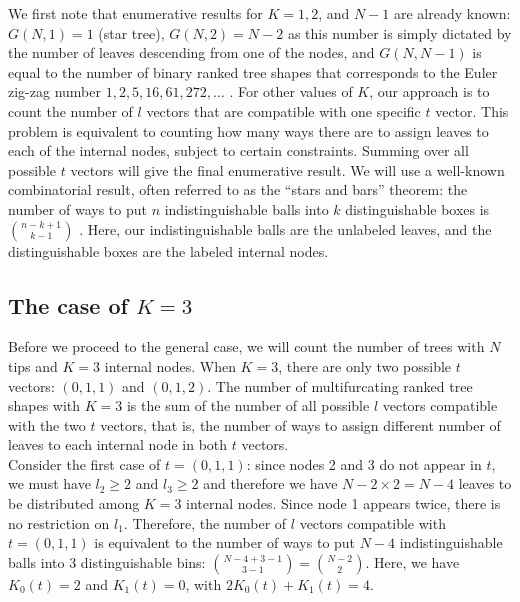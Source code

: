 \documentclass{article}
\begin{document}
We first note that enumerative results for $K=1, 2$, and $N-1$ are already known: 
$G(N,1)= 1$ (star tree), $G(N,2) =  N-2$ as this number is simply dictated by the number of leaves descending from one of the nodes, and $G(N,N-1)$ is equal to the number of binary ranked tree shapes that corresponds to the Euler zig-zag number $1, 2, 5, 16, 61, 272, \ldots$ \citep{kuznetsov1994increasing,palacios2022enumeration}. For other values of $K$, our approach is to count the number of $l$ vectors that are compatible with one specific $t$ vector. This problem is equivalent to counting how many ways there are to assign leaves to each of the internal nodes, subject to certain constraints. Summing over all possible $t$ vectors will give the final enumerative result. We will use a well-known combinatorial result, often referred to as the ``stars and bars'' theorem: the number of ways to put $n$ indistinguishable balls into $k$ distinguishable boxes is $\binom{n-k+1}{k-1}$ \citep{batterson2011competition}. Here, our indistinguishable balls are the unlabeled leaves, and the distinguishable boxes are the labeled internal nodes. 

\subsection{The case of $K=3$}

Before we proceed to the general case, we will count the number of trees with $N$ tips and $K=3$ internal nodes. When $K=3$, there are only two possible $t$ vectors: $(0,1,1)$ and $(0,1,2)$. The number of multifurcating ranked tree shapes with $K=3$ is the sum of the number of all possible $l$ vectors compatible with the two $t$ vectors, that is, the number of ways to assign different number of leaves to each internal node in both $t$ vectors. \\

Consider the first case of $t=(0,1,1)$: since nodes 2 and 3 do not appear in $t$, we must have $l_2\geq 2$ and $l_3\geq 2$ and therefore we have $N-2\times 2=N-4$ leaves to be distributed among $K=3$ internal nodes. Since node 1 appears twice, there is no restriction on $l_1$. Therefore, the number of $l$ vectors compatible with $t=(0,1,1)$ is equivalent to the number of ways to put $N-4$ indistinguishable balls into 3 distinguishable bins: $\binom{N-4+3-1}{3-1} = \binom{N-2}{2}$. Here, we have $K_0(t)=2$ and $K_1(t)=0$, with $2K_0(t)+K_1(t)=4$. \\
\end{document}
